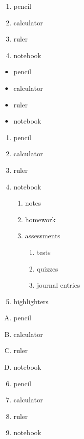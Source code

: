 \documentclass[11pt]{article}
\begin{document}
\begin{enumerate}
\item pencil
\item calculator
\item ruler
\item notebook
\end{enumerate}

\begin{itemize}
\item pencil
\item calculator
\item ruler
\item notebook
\end{itemize}

\begin{enumerate}
\item pencil
\item calculator
\item ruler
\item notebook
	\begin{enumerate}
	\item notes
	\item homework
	\item assessments
		\begin{enumerate}
		\item tests
		\item quizzes
		\item journal entries
		\end{enumerate}
	\end{enumerate}
\item highlighters
\end{enumerate}

\vspace{1cm}

\begin{enumerate}[A.]
\item pencil
\item calculator
\item ruler
\item notebook
\end{enumerate}

\pagebreak

\begin{enumerate} \setcounter{enumi}{5}
\item pencil
\item calculator
\item ruler
\item notebook
\end{enumerate}
\end{document}
